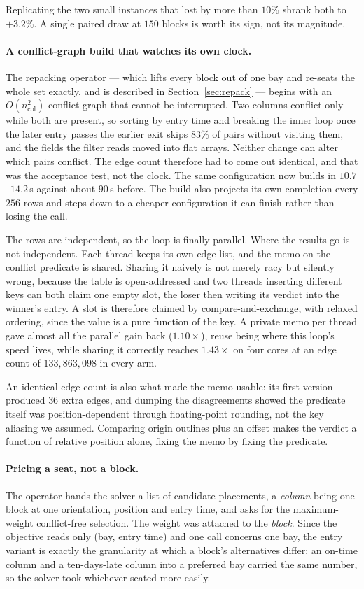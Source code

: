 \documentclass[runningheads]{llncs}
\begin{document}
Replicating the two small instances that lost by more than $10\%$ shrank both to $+3.2\%$. A single
paired draw at $150$ blocks is worth its sign, not its magnitude.

\paragraph{A conflict-graph build that watches its own clock.}
The repacking operator --- which lifts every block out of one bay and re-seats the whole set
exactly, and is described in Section~\ref{sec:repack} --- begins with an $O(n_{\text{col}}^2)$
conflict graph that cannot be interrupted. Two columns conflict only while both are present, so sorting by entry time and
breaking the inner loop once the later entry passes the earlier exit skips $83\%$ of pairs without
visiting them, and the fields the filter reads moved into flat arrays. Neither change can alter
which pairs conflict. The edge count therefore had to come out identical, and that was the
acceptance test, not the clock. The same configuration now builds in $10.7$--$14.2$\,s against about $90$\,s
before. The build also projects its own completion every $256$ rows and steps down to a cheaper
configuration it can finish rather than losing the call.

The rows are independent, so the loop is finally parallel. Where the results go is not independent.
Each thread keeps its own edge list, and the memo on the conflict predicate is shared.
Sharing it naively is not merely racy but silently wrong, because the table is open-addressed and
two threads inserting different keys can both claim one empty slot, the loser then writing its
verdict into the winner's entry. A slot is therefore claimed by compare-and-exchange, with relaxed
ordering, since the value is a pure function of the key. A private memo per thread gave almost all
the parallel gain back ($1.10\times$), reuse being where this loop's speed lives, while sharing it
correctly reaches $1.43\times$ on four cores at an edge count of $133{,}863{,}098$ in every arm.

An identical edge count is also what made the memo usable: its first version produced $36$ extra
edges, and dumping the disagreements showed the predicate itself was position-dependent through
floating-point rounding, not the key aliasing we assumed. Comparing origin outlines plus an offset
makes the verdict a function of relative position alone, fixing the memo by fixing the predicate.


\paragraph{Pricing a seat, not a block.}
The operator hands the solver a list of candidate placements, a \emph{column} being one block at
one orientation, position and entry time, and asks for the maximum-weight conflict-free selection.
The weight was attached to the \emph{block}. Since the objective reads only (bay, entry time) and
one call concerns one bay, the entry variant is exactly the granularity at which a block's
alternatives differ: an on-time column and a ten-days-late column into a preferred bay carried the
same number, so the solver took whichever seated more easily.
\end{document}
